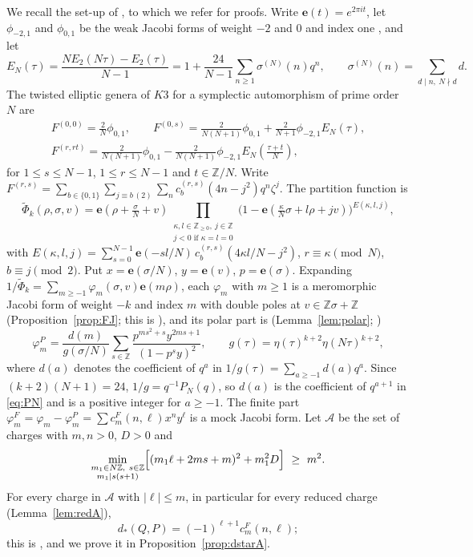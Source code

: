 \documentclass[11pt]{amsart}
\numberwithin{equation}{section}
\theoremstyle{plain}
\theoremstyle{definition}
\theoremstyle{remark}
\newcommand{\Z}{\mathbb{Z}}
\newcommand{\cA}{\mathcal{A}}
\newcommand{\e}{\mathbf{e}}
\newcommand{\pmi}{\phi_{-2,1}}
\newcommand{\pz}{\phi_{0,1}}
\newcommand{\tPhi}{\widetilde{\Phi}}
\begin{document}
We recall the set-up of \cite{Bha26c}, to which we refer for proofs. Write $\e(t)=e^{2\pi it}$, let $\pmi$ and $\pz$ be the weak Jacobi forms of weight $-2$ and $0$ and index one \cite[\S9]{EZ85}, and let
\[
E_N(\tau)=\frac{NE_2(N\tau)-E_2(\tau)}{N-1}=1+\frac{24}{N-1}\sum_{n\ge1}\sigma^{(N)}(n)q^n,\qquad \sigma^{(N)}(n)=\sum_{d\mid n,\ N\nmid d}d .
\]
The twisted elliptic genera of $K3$ for a symplectic automorphism of prime order $N$ are \cite{JS06,DJS06}
\begin{equation}\label{eq:genera}
\begin{gathered}
F^{(0,0)}=\tfrac{2}{N}\pz,\qquad F^{(0,s)}=\tfrac{2}{N(N+1)}\pz+\tfrac{2}{N+1}\pmi E_N(\tau),\\
F^{(r,rt)}=\tfrac{2}{N(N+1)}\pz-\tfrac{2}{N(N+1)}\pmi E_N\!\left(\tfrac{\tau+t}{N}\right),
\end{gathered}
\end{equation}
for $1\le s\le N-1$, $1\le r\le N-1$ and $t\in\Z/N$. Write $F^{(r,s)}=\sum_{b\in\{0,1\}}\sum_{j\equiv b\,(2)}\sum_{n}c_b^{(r,s)}(4n-j^2)q^n\zeta^j$. The partition function is \cite{DJS06}
\begin{equation}\label{eq:product}
\tPhi_k(\rho,\sigma,v)=\e\!\left(\rho+\tfrac{\sigma}{N}+v\right)\prod_{\substack{\kappa,l\in\Z_{\ge0},\ j\in\Z\\ j<0\text{ if }\kappa=l=0}}\bigl(1-\e(\tfrac{\kappa}{N}\sigma+l\rho+jv)\bigr)^{E(\kappa,l,j)},
\end{equation}
with $E(\kappa,l,j)=\sum_{s=0}^{N-1}\e(-sl/N)\,c_b^{(r,s)}(4\kappa l/N-j^2)$, $r\equiv\kappa\pmod N$, $b\equiv j\pmod2$. Put $x=\e(\sigma/N)$, $y=\e(v)$, $p=\e(\sigma)$. Expanding $1/\tPhi_k=\sum_{m\ge-1}\varphi_m(\sigma,v)\e(m\rho)$, each $\varphi_m$ with $m\ge1$ is a meromorphic Jacobi form of weight $-k$ and index $m$ with double poles at $v\in\Z\sigma+\Z$ (Proposition~\ref{prop:FJ}; this is \cite[Theorem~5.2]{BSS25}), and its polar part is (Lemma~\ref{lem:polar}; \cite[(5.45)]{BSS25})
\begin{equation}\label{eq:polar}
\varphi^P_m=\frac{d(m)}{g(\sigma/N)}\sum_{s\in\Z}\frac{p^{ms^2+s}y^{2ms+1}}{(1-p^sy)^2},\qquad g(\tau)=\eta(\tau)^{k+2}\eta(N\tau)^{k+2},
\end{equation}
where $d(a)$ denotes the coefficient of $q^a$ in $1/g(\tau)=\sum_{a\ge-1}d(a)q^a$. Since $(k+2)(N+1)=24$, $1/g=q^{-1}P_N(q)$, so $d(a)$ is the coefficient of $q^{a+1}$ in \eqref{eq:PN} and is a positive integer for $a\ge-1$. The finite part $\varphi^F_m=\varphi_m-\varphi^P_m=\sum c^F_m(n,\ell)x^ny^\ell$ is a mock Jacobi form. Let $\cA$ be the set of charges with $m,n>0$, $D>0$ and
\begin{equation}\label{eq:setA}
\min_{\substack{m_1\in N\Z,\ s\in\Z\\ m_1\mid s(s+1)}}\Bigl[(m_1\ell+2ms+m)^2+m_1^2D\Bigr]\ \ge\ m^2 .
\end{equation}
For every charge in $\cA$ with $|\ell|\le m$, in particular for every reduced charge (Lemma~\ref{lem:redA}),
\begin{equation}\label{eq:dstar}
d_*(Q,P)=(-1)^{\ell+1}c^F_m(n,\ell);
\end{equation}
this is \cite[Theorem~5.4(a) and (5.57)]{BSS25}, and we prove it in Proposition~\ref{prop:dstarA}.
\end{document}
